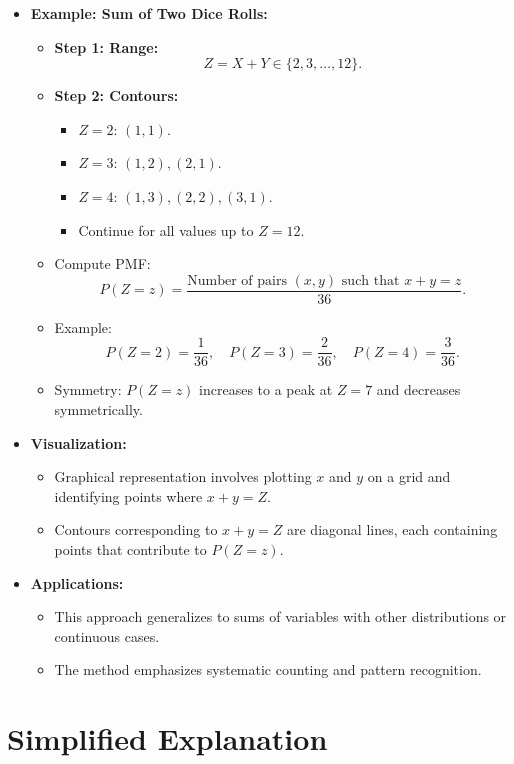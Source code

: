 \documentclass{article}
\begin{document}
\begin{itemize}
  \item \textbf{Example: Sum of Two Dice Rolls:}
    \begin{itemize}
      \item \textbf{Step 1: Range:}
        \[
          Z = X + Y \in \{2, 3, \dots, 12\}.
        \]
      \item \textbf{Step 2: Contours:}
        \begin{itemize}
          \item $Z = 2$: $(1, 1)$.
          \item $Z = 3$: $(1, 2), (2, 1)$.
          \item $Z = 4$: $(1, 3), (2, 2), (3, 1)$.
          \item Continue for all values up to $Z = 12$.
        \end{itemize}
      \item Compute PMF:
        \[
          P(Z = z) = \frac{\text{Number of pairs } (x, y) \text{ such that } x + y = z}{36}.
        \]
      \item Example:
        \[
          P(Z = 2) = \frac{1}{36}, \quad P(Z = 3) = \frac{2}{36}, \quad P(Z = 4) = \frac{3}{36}.
        \]
      \item Symmetry: $P(Z = z)$ increases to a peak at $Z = 7$ and decreases symmetrically.
    \end{itemize}

  \item \textbf{Visualization:}
    \begin{itemize}
      \item Graphical representation involves plotting $x$ and $y$ on a grid and identifying points where $x + y = Z$.
      \item Contours corresponding to $x + y = Z$ are diagonal lines, each containing points that contribute to $P(Z = z)$.
    \end{itemize}

  \item \textbf{Applications:}
    \begin{itemize}
      \item This approach generalizes to sums of variables with other distributions or continuous cases.
      \item The method emphasizes systematic counting and pattern recognition.
    \end{itemize}
\end{itemize}

\section*{Simplified Explanation}
\end{document}
